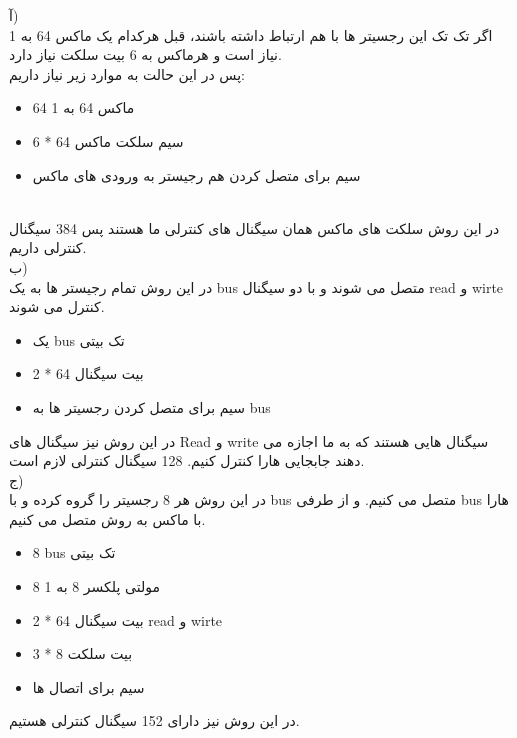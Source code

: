 آ)\\
اگر تک تک این رجسیتر ها با هم ارتباط
داشته باشند، قبل هرکدام یک ماکس 64 به 1 نیاز است و هرماکس به 6 بیت سلکت نیاز دارد.\\
پس در این حالت به موارد زیر نیاز داریم:
\begin{itemize}
    \item 64 ماکس 64 به 1
    \item 6 * 64 سیم سلکت ماکس
    \item سیم برای متصل کردن هم رجیستر به ورودی های ماکس
\end{itemize}
\\
در این روش سلکت های ماکس همان سیگنال های کنترلی ما هستند پس 384 سیگنال کنترلی داریم.\\
ب)\\
در این روش تمام رجیستر ها به یک 
bus
متصل می شوند و با دو سیگنال  
read
و
wirte
کنترل می شوند.
\begin{itemize}
    \item یک bus تک بیتی
    \item 2 * 64 بیت سیگنال
    \item سیم برای متصل کردن رجسیتر ها به bus
\end{itemize}
در این روش نیز سیگنال های 
Read
و
write
سیگنال هایی هستند که به ما اجازه می دهند جابجایی هارا کنترل کنیم.
128 سیگنال کنترلی لازم است.\\
 ج)\\
 در این روش هر 8 رجسیتر را گروه کرده و با 
 bus
 متصل می کنیم. و از طرفی 
 bus
 هارا با ماکس به روش 
 متصل می کنیم.
 \begin{itemize}
     \item 8 bus تک بیتی
     \item 8 مولتی پلکسر 8 به 1
     \item 2 * 64 بیت سیگنال 
     read 
     و 
     wirte
     \item 3 * 8 بیت سلکت
     \item سیم برای اتصال ها
 \end{itemize}
در این روش نیز دارای 
152
سیگنال کنترلی هستیم.